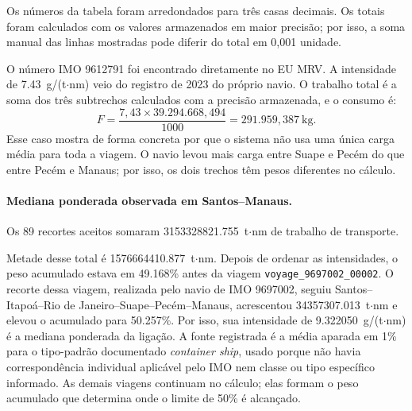 \documentclass[12pt,a4paper]{report}
\begin{document}
\begin{table}[htbp]
\centering
\caption{Cálculo por subtrecho da viagem \texttt{voyage\_9612791\_00011}}
\label{tab:observed-voyage-sublegs}
\end{table}

Os números da tabela foram arredondados para três casas decimais. Os totais foram calculados com os valores armazenados em maior precisão; por isso, a soma manual das linhas mostradas pode diferir do total em 0,001 unidade.

O número IMO 9612791 foi encontrado diretamente no EU MRV. A intensidade de \num{7.43}~g/(t$\cdot$nm) veio do registro de 2023 do próprio navio. O trabalho total é a soma dos três subtrechos calculados com a precisão armazenada, e o consumo é:
\[
F=\frac{7{,}43\times39.294.668{,}494}{1000}=291.959{,}387\ \text{kg}.
\]
Esse caso mostra de forma concreta por que o sistema não usa uma única carga média para toda a viagem. O navio levou mais carga entre Suape e Pecém do que entre Pecém e Manaus; por isso, os dois trechos têm pesos diferentes no cálculo.

\paragraph{Mediana ponderada observada em Santos--Manaus.} Os \num{89} recortes aceitos somaram \num{3153328821.755}~t$\cdot$nm de trabalho de transporte.

Metade desse total é \num{1576664410.877}~t$\cdot$nm. Depois de ordenar as intensidades, o peso acumulado estava em \num{49.168}\% antes da viagem \texttt{voyage\_9697002\_00002}. O recorte dessa viagem, realizada pelo navio de IMO 9697002, seguiu Santos--Itapoá--Rio de Janeiro--Suape--Pecém--Manaus, acrescentou \num{34357307.013}~t$\cdot$nm e elevou o acumulado para \num{50.257}\%. Por isso, sua intensidade de \num{9.322050}~g/(t$\cdot$nm) é a mediana ponderada da ligação. A fonte registrada é a média aparada em 1\% para o tipo-padrão documentado \emph{container ship}, usado porque não havia correspondência individual aplicável pelo IMO nem classe ou tipo específico informado. As demais viagens continuam no cálculo; elas formam o peso acumulado que determina onde o limite de 50\% é alcançado.
\end{document}
